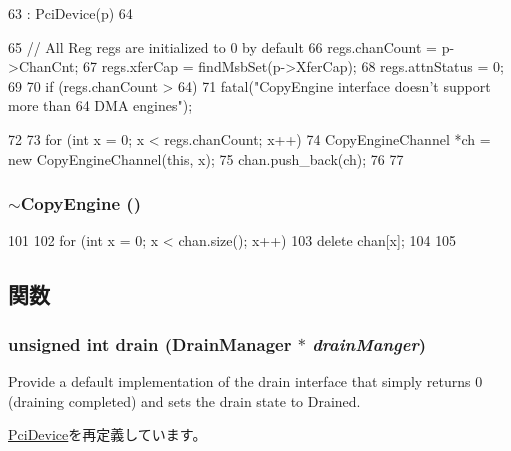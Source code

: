 \begin{DoxyCode}
63     : PciDevice(p)
64 {
65     // All Reg regs are initialized to 0 by default
66     regs.chanCount = p->ChanCnt;
67     regs.xferCap = findMsbSet(p->XferCap);
68     regs.attnStatus = 0;
69 
70     if (regs.chanCount > 64)
71         fatal("CopyEngine interface doesn't support more than 64 DMA engines\n");
      
72 
73     for (int x = 0; x < regs.chanCount; x++) {
74         CopyEngineChannel *ch = new CopyEngineChannel(this, x);
75         chan.push_back(ch);
76     }
77 }
\end{DoxyCode}
\hypertarget{classCopyEngine_a1e9353806b1e8062eac347916ca32ac7}{
\subsubsection[{$\sim$CopyEngine}]{\setlength{\rightskip}{0pt plus 5cm}$\sim${\bf CopyEngine} ()}}
\label{classCopyEngine_a1e9353806b1e8062eac347916ca32ac7}



\begin{DoxyCode}
101 {
102     for (int x = 0; x < chan.size(); x++) {
103         delete chan[x];
104     }
105 }
\end{DoxyCode}


\subsection{関数}
\hypertarget{classCopyEngine_a6bf479c521c7c3eb473822d953275b26}{
\subsubsection[{drain}]{\setlength{\rightskip}{0pt plus 5cm}unsigned int drain ({\bf DrainManager} $\ast$ {\em drainManger})}}
\label{classCopyEngine_a6bf479c521c7c3eb473822d953275b26}
Provide a default implementation of the drain interface that simply returns 0 (draining completed) and sets the drain state to Drained. 

\hyperlink{classPciDevice_aa8a18d230dba7a674ac8a0b4f35bc36a}{PciDevice}を再定義しています。


